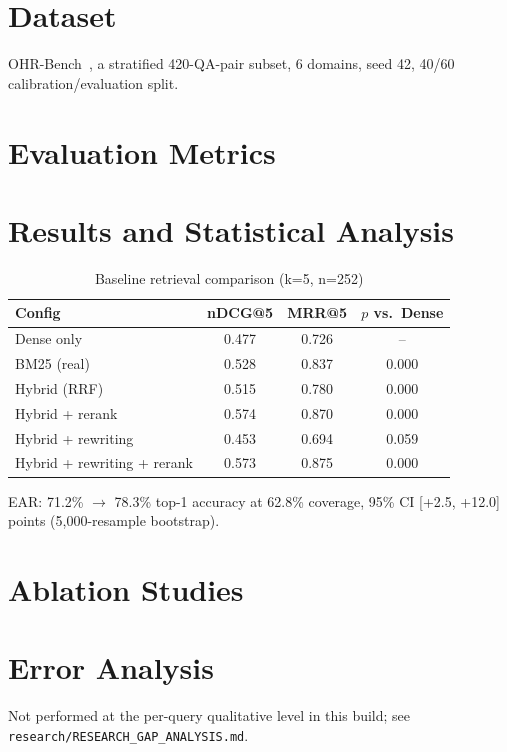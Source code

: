 \documentclass[conference]{IEEEtran}
\begin{document}
\section{Dataset}
OHR-Bench~\cite{zhang2024ohrbench}, a stratified 420-QA-pair subset, 6 domains, seed
42, 40/60 calibration/evaluation split.

\section{Evaluation Metrics}

\section{Results and Statistical Analysis}
\begin{table}[h]
\centering
\caption{Baseline retrieval comparison (k=5, n=252)}
\begin{tabular}{lccc}
\toprule
Config & nDCG@5 & MRR@5 & $p$ vs.\ Dense \\
\midrule
Dense only & 0.477 & 0.726 & -- \\
BM25 (real) & 0.528 & 0.837 & 0.000 \\
Hybrid (RRF) & 0.515 & 0.780 & 0.000 \\
Hybrid + rerank & 0.574 & 0.870 & 0.000 \\
Hybrid + rewriting & 0.453 & 0.694 & 0.059 \\
Hybrid + rewriting + rerank & 0.573 & 0.875 & 0.000 \\
\bottomrule
\end{tabular}
\end{table}

EAR: 71.2\% $\rightarrow$ 78.3\% top-1 accuracy at 62.8\% coverage, 95\% CI
[+2.5, +12.0] points (5{,}000-resample bootstrap).

\section{Ablation Studies}

\section{Error Analysis}
Not performed at the per-query qualitative level in this build; see
\texttt{research/RESEARCH\_GAP\_ANALYSIS.md}.
\end{document}
